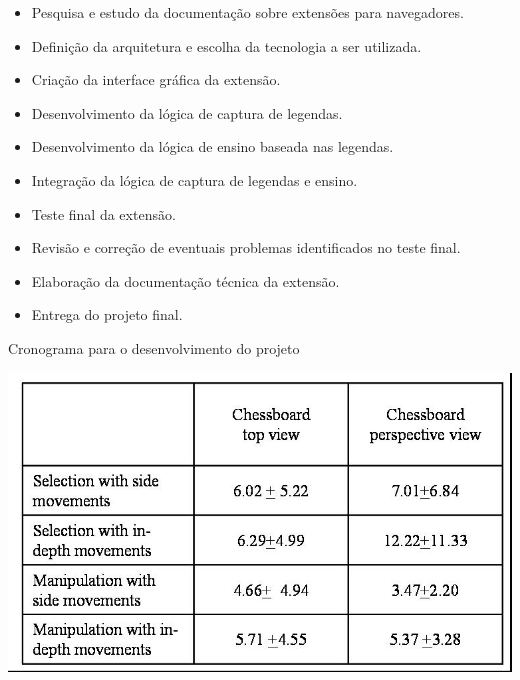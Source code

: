 \documentclass[12pt]{article}
\begin{document}
\begin{itemize}
\item Pesquisa e estudo da documentação sobre extensões para navegadores.
\item Definição da arquitetura e escolha da tecnologia a ser utilizada.
\item Criação da interface gráfica da extensão.
\item Desenvolvimento da lógica de captura de legendas.
\item Desenvolvimento da lógica de ensino baseada nas legendas.
\item Integração da lógica de captura de legendas e ensino.
\item Teste final da extensão.
\item Revisão e correção de eventuais problemas identificados no teste final.
\item Elaboração da documentação técnica da extensão.
\item Entrega do projeto final.
\end{itemize}

\begin{table}[ht]
\centering
\caption{Cronograma para o desenvolvimento do projeto }
\label{tab:exTable1}
\includegraphics[width=.7\textwidth]{table.jpg}
\end{table}
\end{document}
